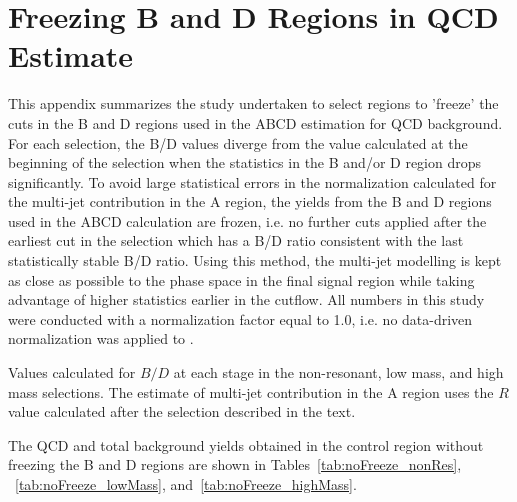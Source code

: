 \chapter{Freezing B and D Regions in QCD Estimate}
\label{app:qcd_BDregionStudy_appendix}

This appendix summarizes the study undertaken to select regions to 'freeze' the cuts in the B and D regions used in the ABCD estimation for QCD background. For each selection, the B/D values diverge 
from the value calculated at the beginning of the selection when the statistics in the B and/or D region drops significantly. To avoid large statistical errors in the normalization calculated for 
the multi-jet contribution in the A region, the yields from the B and D regions used in the ABCD calculation are frozen, i.e. no further cuts applied after the earliest cut in the selection which has
a B/D ratio consistent with the last statistically stable B/D ratio. Using this method, the multi-jet modelling is kept as close as possible to the phase space in the final signal region while taking
advantage of higher statistics earlier in the cutflow. All numbers in this study were conducted with a \ttbar normalization factor equal to 1.0, i.e. no data-driven normalization was applied to \ttbar. 

\begin{table}[h!]
\centering

\caption[$B/D$ at each stage in the non-resonant,
  low mass, and high mass selections]{Values calculated for $B/D$ at each stage in the non-resonant,
  low mass, and high mass selections. The estimate of multi-jet
  contribution in the A region uses the $R$ value calculated after the
   selection described in the text.} \label{tab:bdValues}

\end{table}

The QCD and total background yields obtained in the \mbb control region without freezing the B and D regions are shown in Tables~\ref{tab:noFreeze_nonRes}, ~\ref{tab:noFreeze_lowMass}, and~\ref{tab:noFreeze_highMass}.


